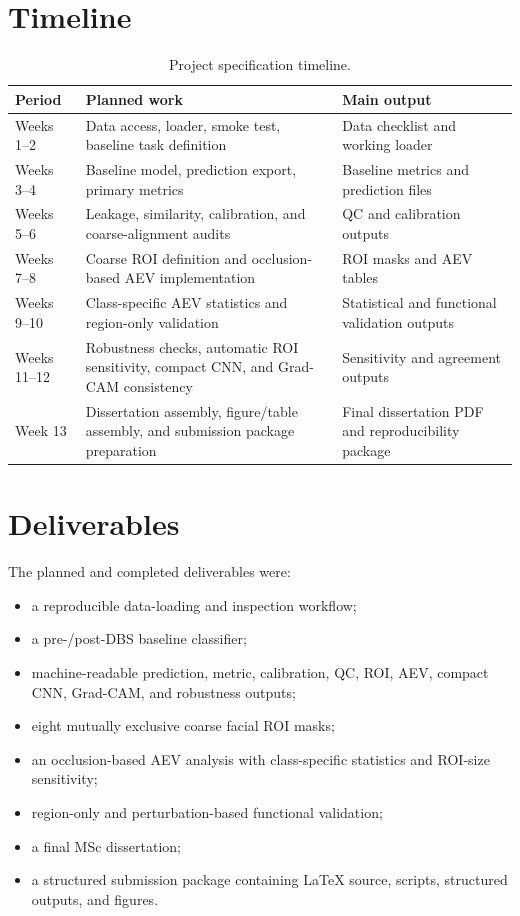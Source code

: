 \documentclass[oneside,12pt]{article}
\begin{document}
\section*{Timeline}

\begin{table}[htbp]
\centering
\scriptsize
\caption{Project specification timeline.}
\begin{tabularx}{\textwidth}{>{\raggedright\arraybackslash}p{}>{\raggedright\arraybackslash}X>{\raggedright\arraybackslash}X}
\toprule
Period & Planned work & Main output \\
\midrule
Weeks 1--2 & Data access, loader, smoke test, baseline task definition & Data checklist and working loader \\
Weeks 3--4 & Baseline model, prediction export, primary metrics & Baseline metrics and prediction files \\
Weeks 5--6 & Leakage, similarity, calibration, and coarse-alignment audits & QC and calibration outputs \\
Weeks 7--8 & Coarse ROI definition and occlusion-based AEV implementation & ROI masks and AEV tables \\
Weeks 9--10 & Class-specific AEV statistics and region-only validation & Statistical and functional validation outputs \\
Weeks 11--12 & Robustness checks, automatic ROI sensitivity, compact CNN, and Grad-CAM consistency & Sensitivity and agreement outputs \\
Week 13 & Dissertation assembly, figure/table assembly, and submission package preparation & Final dissertation PDF and reproducibility package \\
\bottomrule
\end{tabularx}
\end{table}

\section*{Deliverables}

The planned and completed deliverables were:

\begin{itemize}
\item a reproducible data-loading and inspection workflow;
\item a pre-/post-DBS baseline classifier;
\item machine-readable prediction, metric, calibration, QC, ROI, AEV, compact CNN, Grad-CAM, and robustness outputs;
\item eight mutually exclusive coarse facial ROI masks;
\item an occlusion-based AEV analysis with class-specific statistics and ROI-size sensitivity;
\item region-only and perturbation-based functional validation;
\item a final MSc dissertation;
\item a structured submission package containing LaTeX source, scripts, structured outputs, and figures.
\end{itemize}
\end{document}
